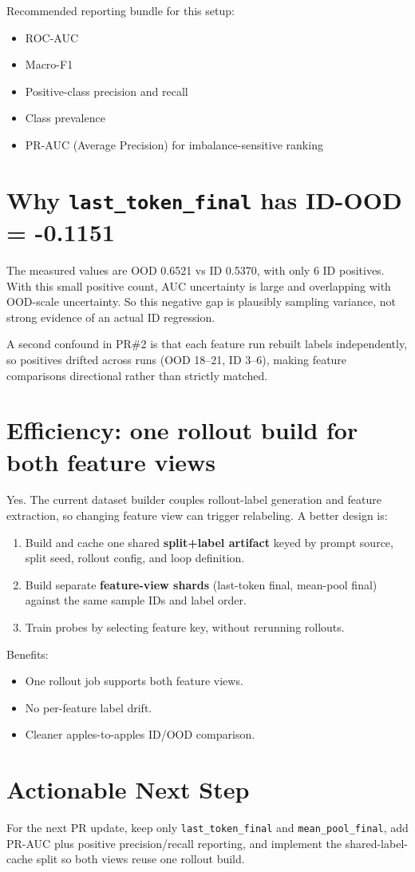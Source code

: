 \documentclass[11pt]{article}
\begin{document}
Recommended reporting bundle for this setup:
\begin{itemize}
  \item ROC-AUC
  \item Macro-F1
  \item Positive-class precision and recall
  \item Class prevalence
  \item PR-AUC (Average Precision) for imbalance-sensitive ranking
\end{itemize}

\section*{Why \texttt{last\_token\_final} has ID-\!OOD = -0.1151}
The measured values are OOD 0.6521 vs ID 0.5370, with only 6 ID positives. With this small positive count, AUC uncertainty is large and overlapping with OOD-scale uncertainty. So this negative gap is plausibly sampling variance, not strong evidence of an actual ID regression.

A second confound in PR\#2 is that each feature run rebuilt labels independently, so positives drifted across runs (OOD 18--21, ID 3--6), making feature comparisons directional rather than strictly matched.

\section*{Efficiency: one rollout build for both feature views}
Yes. The current dataset builder couples rollout-label generation and feature extraction, so changing feature view can trigger relabeling. A better design is:
\begin{enumerate}
  \item Build and cache one shared \textbf{split+label artifact} keyed by prompt source, split seed, rollout config, and loop definition.
  \item Build separate \textbf{feature-view shards} (last-token final, mean-pool final) against the same sample IDs and label order.
  \item Train probes by selecting feature key, without rerunning rollouts.
\end{enumerate}

Benefits:
\begin{itemize}
  \item One rollout job supports both feature views.
  \item No per-feature label drift.
  \item Cleaner apples-to-apples ID/OOD comparison.
\end{itemize}

\section*{Actionable Next Step}
For the next PR update, keep only \texttt{last\_token\_final} and \texttt{mean\_pool\_final}, add PR-AUC plus positive precision/recall reporting, and implement the shared-label-cache split so both views reuse one rollout build.
\end{document}
